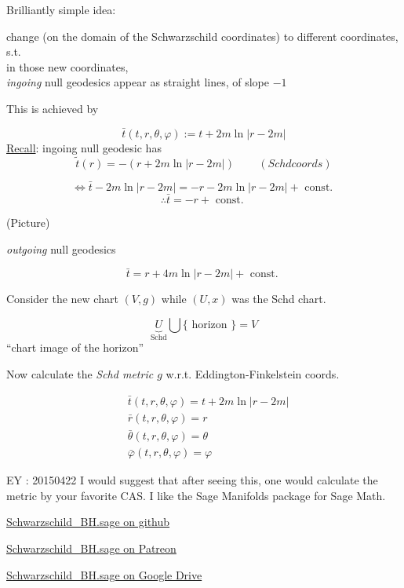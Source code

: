 \documentclass[10pt]{amsart}
\begin{document}
\begin{multicols*}{2}
	Brilliantly simple idea: 
	
	change (on the domain of the Schwarzschild coordinates) to different coordinates, s.t.  \\ 
	in those new coordinates, \\
	\emph{ingoing} null geodesics appear as straight lines, of slope $-1$ 
	
	This is achieved by 
	
	\[
	\bar{t}(t,r,\theta, \varphi) := t + 2m \ln{ | r-2m | }
	\]
	\underline{Recall}: ingoing null geodesic has 
	\[
	\widetilde{t}(r) = -(r + 2m \ln{ |r-2m |} )  \quad \quad \, (Schd coords)
	\]
	
	\[
	\Longleftrightarrow \bar{t} - 2m \ln{ |r-2m |} = -r - 2m \ln{ |r-2m |} + \text{ const. }
	\]
	\[
	\therefore \bar{t} = -r + \text{ const. }
	\]
	
	(Picture)
	
	\emph{outgoing} null geodesics
	
	\[
	\bar{t} = r + 4 m \ln{ |r - 2m| } + \text{ const. }
	\]
	
	Consider the new chart $(V,g)$ while $(U,x)$ was the Schd chart.
	
	\[
	\underbrace{U}_{\text{Schd}} \bigcup \lbrace \text{ horizon } \rbrace = V
	\]
	``chart image of the horizon''
	
	Now calculate the \emph{Schd metric $g$ } w.r.t. Eddington-Finkelstein coords.
	
	\[
	\begin{aligned}
	& \bar{t}(t,r,\theta,\varphi) = t + 2m\ln{ |r -2m | } \\
	& \bar{r}(t,r,\theta,\varphi) = r \\
	& \bar{\theta}(t,r,\theta,\varphi) = \theta \\
	& \bar{\varphi}(t,r,\theta,\varphi) = \varphi
	\end{aligned}
	\]
	
	EY : 20150422 I would suggest that after seeing this, one would calculate the metric by your favorite CAS.  I like the Sage Manifolds package for Sage Math.  
	
	\href{https://github.com/ernestyalumni/diffgeo-by-sagemnfd/blob/master/Schwarzschild_BH.sage}{Schwarzschild\_BH.sage on github}
	
	\href{https://www.patreon.com/file?s=645287&h=2254352&i=108637}{Schwarzschild\_BH.sage on Patreon}
	
	\href{https://drive.google.com/file/d/0B1H1Ygkr4EWJdllTR3czQU9DeW8/view?usp=sharing}{Schwarzschild\_BH.sage on Google Drive}
	

\end{multicols*}
\end{document}
